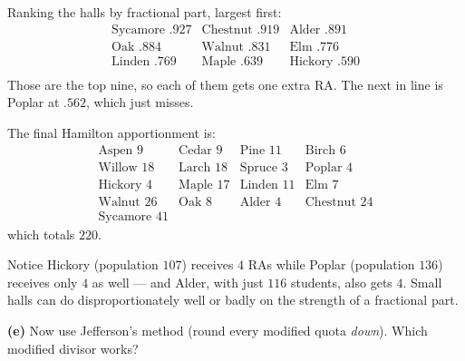 \documentclass[12pt]{ximera}
\begin{document}
\begin{problem}
\begin{prompt}
\begin{selectAll}
\end{selectAll}

\begin{feedback}
Ranking the halls by fractional part, largest first:
\[
\begin{array}{lll}
\text{Sycamore } .927 & \text{Chestnut } .919 & \text{Alder } .891\\
\text{Oak } .884 & \text{Walnut } .831 & \text{Elm } .776\\
\text{Linden } .769 & \text{Maple } .639 & \text{Hickory } .590\\
\end{array}
\]
Those are the top nine, so each of them gets one extra RA. The next in line is Poplar
at $.562$, which just misses.

The final Hamilton apportionment is:
\[
\begin{array}{llll}
\text{Aspen } 9 & \text{Cedar } 9 & \text{Pine } 11 & \text{Birch } 6\\
\text{Willow } 18 & \text{Larch } 18 & \text{Spruce } 3 & \text{Poplar } 4\\
\text{Hickory } 4 & \text{Maple } 17 & \text{Linden } 11 & \text{Elm } 7\\
\text{Walnut } 26 & \text{Oak } 8 & \text{Alder } 4 & \text{Chestnut } 24\\
\text{Sycamore } 41 & & &
\end{array}
\]
which totals $220$. \checkmark

Notice Hickory (population $107$) receives $4$ RAs while Poplar (population $136$)
receives only $4$ as well --- and Alder, with just $116$ students, also gets $4$. Small
halls can do disproportionately well or badly on the strength of a fractional part.
\end{feedback}
\end{prompt}
\begin{prompt}
\textbf{(e)} Now use Jefferson's method (round every modified quota \emph{down}). Which
modified divisor works?

\begin{multipleChoice}
\end{multipleChoice}


\end{prompt}
\end{problem}
\end{document}
